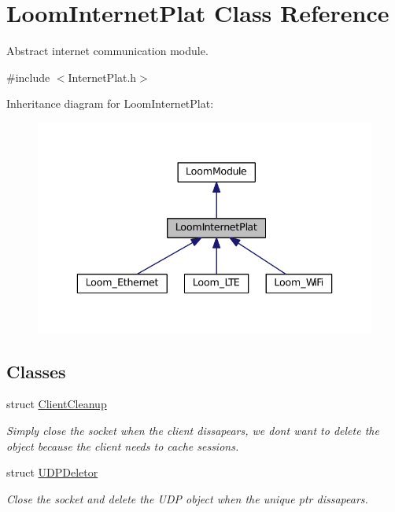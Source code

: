 \hypertarget{class_loom_internet_plat}{}\section{Loom\+Internet\+Plat Class Reference}
\label{class_loom_internet_plat}


Abstract internet communication module.  




{\ttfamily \#include $<$Internet\+Plat.\+h$>$}



Inheritance diagram for Loom\+Internet\+Plat\+:\nopagebreak
\begin{figure}[H]
\begin{center}
\leavevmode
\includegraphics[width=336pt]{class_loom_internet_plat__inherit__graph}
\end{center}
\end{figure}
\subsection*{Classes}
\begin{DoxyCompactItemize}
\item 
struct \hyperlink{struct_loom_internet_plat_1_1_client_cleanup}{Client\+Cleanup}
\begin{DoxyCompactList}\small\item\em Simply close the socket when the client dissapears, we don\textquotesingle{}t want to delete the object because the client needs to cache sessions. \end{DoxyCompactList}\item 
struct \hyperlink{struct_loom_internet_plat_1_1_u_d_p_deletor}{U\+D\+P\+Deletor}
\begin{DoxyCompactList}\small\item\em Close the socket and delete the U\+DP object when the unique ptr dissapears. \end{DoxyCompactList}\end{DoxyCompactItemize}
